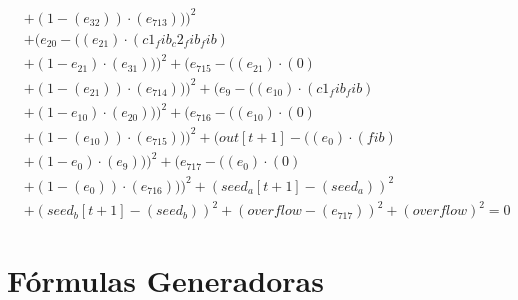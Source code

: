 \documentclass[10pt, a4paper]{article}
\begin{document}
\begin{align*}
& + (1 - (e_{32})) \cdot (e_{713})))^{2} \\
& + (e_{20} - ((e_{21})  \cdot  (c1_fib_c2_fib_fib) \\
& + (1 - e_{21})  \cdot  (e_{31})))^{2} + (e_{715} - ((e_{21}) \cdot (0) \\
& + (1 - (e_{21})) \cdot (e_{714})))^{2} + (e_{9} - ((e_{10})  \cdot  (c1_fib_fib) \\
& + (1 - e_{10})  \cdot  (e_{20})))^{2} + (e_{716} - ((e_{10}) \cdot (0) \\
& + (1 - (e_{10})) \cdot (e_{715})))^{2} + (out[t+1] - ((e_{0})  \cdot  (fib) \\
& + (1 - e_{0})  \cdot  (e_{9})))^{2} + (e_{717} - ((e_{0}) \cdot (0) \\
& + (1 - (e_{0})) \cdot (e_{716})))^{2} + (seed_a[t+1] - (seed_a))^{2} \\
& + (seed_b[t+1] - (seed_b))^{2} + (overflow - (e_{717}))^{2} + (overflow)^{2} = 0
\end{align*}\part{Fórmulas Generadoras}
\end{document}
